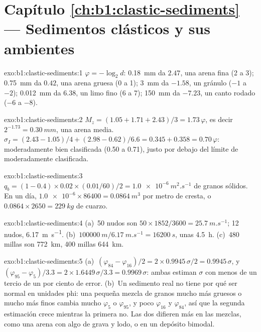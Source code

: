 \section*{Capítulo \ref{ch:b1:clastic-sediments} --- Sedimentos clásticos y sus ambientes}

\begin{solution}{exo:b1:clastic-sediments:1}
$\varphi = -\log_2 d$: \qty{0.18}{mm} da $2.47$, una arena fina (2 a 3);
\qty{0.75}{mm} da $0.42$, una arena gruesa (0 a 1); \qty{3}{mm} da
$-1.58$, un gránulo ($-1$ a $-2$); \qty{0.012}{mm} da $6.38$, un limo fino (6
a 7); \qty{150}{mm} da $-7.23$, un canto rodado ($-6$ a $-8$).
\end{solution}

\begin{solution}{exo:b1:clastic-sediments:2}
$M_z = (1.05 + 1.71 + 2.43)/3 = 1.73\,\varphi$, es decir $2^{-1.73} =
\qty{0.30}{mm}$, una arena media. $\sigma_I = (2.43 - 1.05)/4 + (2.98 - 0.62)/6.6
= 0.345 + 0.358 = 0.70\,\varphi$: moderadamente bien clasificada (0.50 a 0.71), justo
por debajo del límite de moderadamente clasificada.
\end{solution}

\begin{solution}{exo:b1:clastic-sediments:3}
$q_b = (1 - 0.4) \times 0.02 \times (\num{0.01}/60)/2 = \qty{1.0e-6}{m^2.s^{-1}}$
de granos sólidos. En un día, $\num{1.0e-6} \times 86400 = \qty{0.0864}{m^3}$ por
metro de cresta, o $0.0864 \times 2650 = \qty{229}{kg}$ de cuarzo.
\end{solution}

\begin{solution}{exo:b1:clastic-sediments:4}
(a)~50 nudos son $50 \times 1852/3600 = \qty{25.7}{m.s^{-1}}$; 12 nudos,
\qty{6.17}{m.s^{-1}}. (b)~$\qty{100000}{m}/\qty{6.17}{m.s^{-1}} =
\qty{16200}{s}$, unas \qty{4.5}{h}. (c)~480 millas son \qty{772}{km}, 400 millas
\qty{644}{km}.
\end{solution}

\begin{solution}{exo:b1:clastic-sediments:5}
(a)~$(\varphi_{84} - \varphi_{16})/2 = 2 \times 0.9945\,\sigma/2 =
0.9945\,\sigma$, y $(\varphi_{95} - \varphi_5)/3.3 = 2 \times
1.6449\,\sigma/3.3 = 0.9969\,\sigma$: ambas estiman $\sigma$ con menos de un tercio de un
por ciento de error. (b)~Un sedimento real no tiene por qué ser normal en unidades phi: una pequeña
mezcla de granos mucho más gruesos o mucho más finos cambia mucho $\varphi_5$ o
$\varphi_{95}$, y poco $\varphi_{16}$ y $\varphi_{84}$, así que la segunda
estimación crece mientras la primera no. Las dos difieren más en las mezclas, como una arena con algo de grava y lodo, o en un depósito bimodal.
\end{solution}

